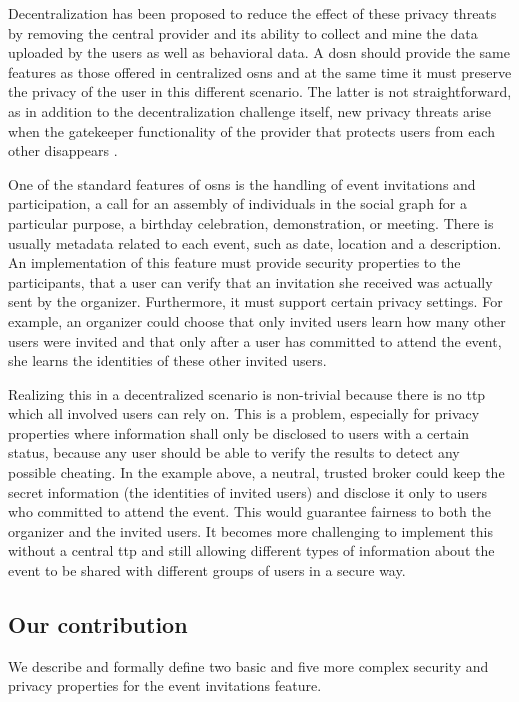 Decentralization has been proposed to reduce the effect of these privacy threats
by removing the central provider and its ability to collect and 
mine the data uploaded by the users as well as behavioral data. A \Ac{dosn} should 
provide the same features as those offered in centralized \Acp{osn} and 
at the same time it must preserve the privacy of the user in this different 
scenario. The latter is not straightforward, 
as in addition to the decentralization challenge itself, new privacy threats 
arise when the gatekeeper functionality of the provider that protects users from each other 
disappears \cite{GreschbachKB12}.

One of the standard features of \Acp{osn} is the handling 
of event invitations and participation, \ie a call for an assembly of individuals 
in the social graph for a particular purpose, \eg a birthday celebration, demonstration, 
or meeting. There is usually metadata related to each event, such as date, 
location and a description.
An implementation of this feature must provide security properties to the participants, \eg
that a user can verify that an invitation she received was actually sent
by the organizer. Furthermore, it must support certain privacy settings.
For example, an organizer could choose that only invited users learn how
many other users were invited and that only after a user has committed
to attend the event, she learns the identities of these other invited
users.

Realizing this in a decentralized scenario is non-trivial because there
is no \Ac{ttp} which all involved users can rely on. This is a problem, 
especially for privacy properties where information shall only be
disclosed to users with a certain status, because any user should be able 
to verify the results to detect any possible cheating. In the example above, a
neutral, trusted broker could keep the secret information (the
identities of invited users) and disclose it only to users who
committed to attend the event. This would guarantee fairness to both the
organizer and the invited users. It becomes more challenging to
implement this without a central \Ac{ttp} and still allowing different
types of information about the event to be shared with different groups
of users in a secure way.

\subsection{Our contribution}
	\label{subsection:event-invitations-dosns:our-contribution}
We describe and formally define two basic and five more complex security
and privacy properties for the event invitations feature. 

